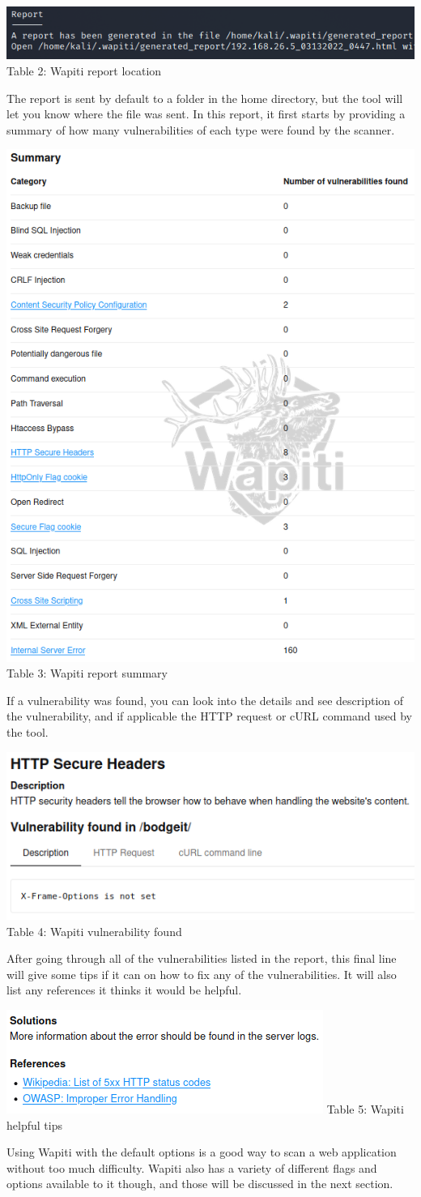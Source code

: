 \begin{center}
\includegraphics[width=.55\textwidth]{report_final.png}
Table 2: Wapiti report location
\end{center}
The report is sent by default to a folder in the home directory, but the tool will let you know where the file was sent.
In this report, it first starts by providing a summary of how many vulnerabilities of each type were found by the scanner.
\begin{center}
\includegraphics[width=.5\textwidth]{report_sum.png}
Table 3: Wapiti report summary
\end{center}
If a vulnerability was found, you can look into the details and see description of the vulnerability, and if applicable the HTTP request or 
cURL command used by the tool.
\begin{center}
\includegraphics[width=.5\textwidth]{ex_error.png}
Table 4: Wapiti vulnerability found
\end{center}
After going through all of the vulnerabilities listed in the report, this final line will give some tips if it can on how to fix any of the vulnerabilities. 
It will also list any references it thinks it would be helpful.
\begin{center}
\includegraphics[width=.5\textwidth]{help.png}
Table 5: Wapiti helpful tips
\end{center}
Using Wapiti with the default options is a good way to scan a web application without too much difficulty. Wapiti also has 
a variety of different flags and options available to it though, and those will be discussed in the next section.
